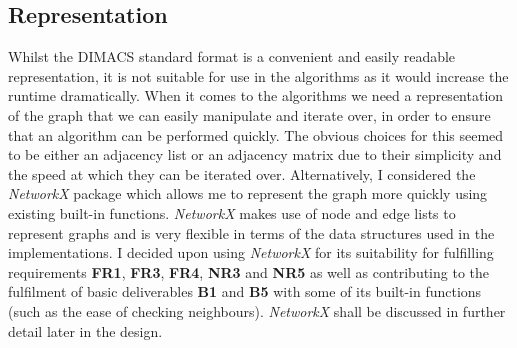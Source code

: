 \documentclass[12pt,a4paper]{article}
\begin{document}
\subsection*{Representation}
\noindent
Whilst the DIMACS standard format is a convenient and easily readable representation, it is not suitable for use in the algorithms as it would increase the runtime dramatically. When it comes to the algorithms we need a representation of the graph that we can easily manipulate and iterate over, in order to ensure that an algorithm can be performed quickly. The obvious choices for this seemed to be either an adjacency list or an adjacency matrix due to their simplicity and the speed at which they can be iterated over. Alternatively, I considered the \textit{NetworkX} package which allows me to represent the graph more quickly using existing built-in functions. \textit{NetworkX} makes use of node and edge lists to represent graphs and is very flexible in terms of the data structures used in the implementations. I decided upon using \textit{NetworkX} for its suitability for fulfilling requirements \textbf{FR1}, \textbf{FR3}, \textbf{FR4}, \textbf{NR3} and \textbf{NR5} as well as contributing to the fulfilment of basic deliverables \textbf{B1} and \textbf{B5} with some of its built-in functions (such as the ease of checking neighbours).  \textit{NetworkX} shall be discussed in further detail later in the design.
\newpage
\end{document}
